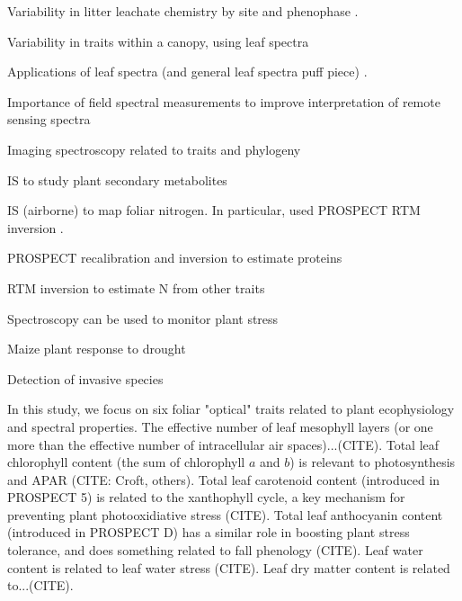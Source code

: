   Variability in litter leachate chemistry by site and phenophase \cite{hudson_2018_american}.

  Variability in traits within a canopy, using leaf spectra \cite{gara_2018_impact}

Applications of leaf spectra (and general leaf spectra puff piece) \cite{cavenderbares_2017_harnessing}.

    Importance of field spectral measurements to improve interpretation of remote sensing spectra

Imaging spectroscopy related to traits and phylogeny \cite{mcmanus_2016_phylogenetic}

IS to study plant secondary metabolites \cite{couture_2016_spectroscopic}

IS (airborne) to map foliar nitrogen. In particular, used PROSPECT RTM inversion \cite{wang_2018_mapping}.

  PROSPECT recalibration and inversion to estimate proteins \cite{wang_2015_applicability}

  RTM inversion to estimate N from other traits \cite{wang_2015_leaf}

Spectroscopy can be used to monitor plant stress

    Maize plant response to drought \cite{sun_2018_reflectance}

Detection of invasive species \cite{ewald_2018_analyzing}

In this study, we focus on six foliar "optical" traits related to plant ecophysiology and spectral properties.
The effective number of leaf mesophyll layers (or one more than the effective number of intracellular air spaces)...(CITE).
Total leaf chlorophyll content (the sum of chlorophyll $a$ and $b$) is relevant to photosynthesis and APAR (CITE: Croft, others).
Total leaf carotenoid content (introduced in PROSPECT 5) is related to the xanthophyll cycle, a key mechanism for preventing plant photooxidiative stress (CITE).
Total leaf anthocyanin content (introduced in PROSPECT D) has a similar role in boosting plant stress tolerance, and does something related to fall phenology (CITE).
Leaf water content is related to leaf water stress (CITE).
Leaf dry matter content is related to...(CITE).

